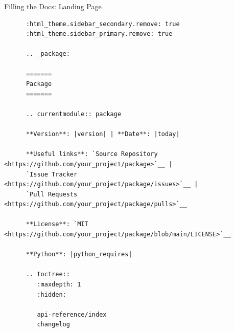 \begin{darkframe}[fragile]{Filling the Docs: Landing Page}
    \footnotesize
    \begin{verbatim}
      :html_theme.sidebar_secondary.remove: true
      :html_theme.sidebar_primary.remove: true

      .. _package:

      =======
      Package
      =======

      .. currentmodule:: package

      **Version**: |version| | **Date**: |today|

      **Useful links**: `Source Repository <https://github.com/your_project/package>`__ |
      `Issue Tracker <https://github.com/your_project/package/issues>`__ |
      `Pull Requests <https://github.com/your_project/package/pulls>`__

      **License**: `MIT <https://github.com/your_project/package/blob/main/LICENSE>`__

      **Python**: |python_requires|

      .. toctree::
         :maxdepth: 1
         :hidden:

         api-reference/index
         changelog
    \end{verbatim}
\end{darkframe}


